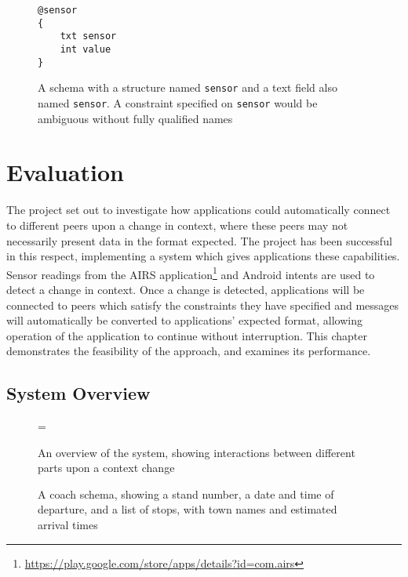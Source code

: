 \documentclass[12pt,twoside,notitlepage]{report}
\begin{document}
\begin{figure}[h]
\begin{lstlisting}
@sensor
{
	txt sensor
	int value
}
\end{lstlisting}
\caption[Ambiguously Named Schema]{A schema with a structure named {\tt sensor} and a text field also named {\tt sensor}. A constraint specified on {\tt sensor} would be ambiguous without fully qualified names}
\label{fig:repeatednameschema}
\end{figure}


\cleardoublepage


\chapter{Evaluation}

The project set out to investigate how applications could automatically connect to different peers upon a change in context, where these peers may not necessarily present data in the format expected. 
The project has been successful in this respect, implementing a system which gives applications these capabilities.  
Sensor readings from the AIRS application\footnote{\url{https://play.google.com/store/apps/details?id=com.airs}} and Android intents are used to detect a change in context. 
Once a change is detected, applications will be connected to peers which satisfy the constraints they have specified and messages will automatically be converted to applications' expected format, allowing operation of the application to continue without interruption. 
This chapter demonstrates the feasibility of the approach, and examines its performance. 

\section{System Overview}

\begin{figure}[t]
\epsfxsize=\hsize
\centerline{}
\caption[System Overview]{An overview of the system, showing interactions between different parts upon a context change}
\label{fig:system_overview}
\end{figure}

\begin{figure}

\caption[Example Schema for a Coach]{A coach schema, showing a stand number, a date and time of departure, and a list of stops, with town names and estimated arrival times}
\label{fig:coach-schema-eval}
\end{figure}
\end{document}

